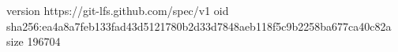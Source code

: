 version https://git-lfs.github.com/spec/v1
oid sha256:ea4a8a7feb133fad43d5121780b2d33d7848aeb118f5c9b2258ba677ca40c82a
size 196704
